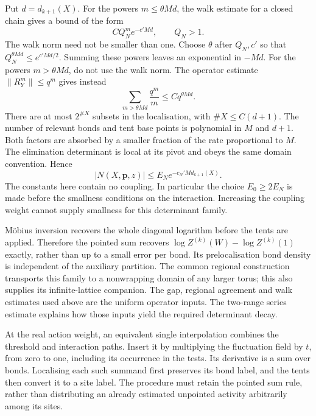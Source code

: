 \documentclass[11pt,letterpaper,reqno]{amsart}
\theoremstyle{definition}
\theoremstyle{remark}
\begin{document}
Put $d=d_{k+1}(X)$. For the powers
$m\le\theta Md$, the walk estimate for a closed chain gives
a bound of the form
\[
 C Q_N^m e^{-c'Md},\qquad Q_N>1.
\]
The walk norm need not be smaller than one. Choose $\theta$
after $Q_N,c'$ so that
$Q_N^{\theta Md}\le e^{c'Md/2}$. Summing these powers leaves
an exponential in $-Md$. For the powers $m>\theta Md$, do
not use the walk norm. The operator estimate $\|R_Y^m\|\le q^m$
gives instead
\[
 \sum_{m>\theta Md}\frac{q^m}{m}
          \le Cq^{\theta Md}.
\]
There are at most $2^{\#X}$ subsets in the localisation, with
$\#X\le C(d+1)$. The number of relevant bonds and tent
base points is polynomial in $M$ and $d+1$. Both factors
are absorbed by a smaller fraction of the rate proportional
to $M$. The elimination determinant is local at its pivot
and obeys the same domain convention. Hence
\begin{equation}\label{eq:deep-normalizer-bound}
 |N(X,\mathbf p,z)|\le E_Ne^{-c_N'Md_{k+1}(X)}.
\end{equation}
The constants here contain no coupling. In particular the
choice $E_0\ge2E_N$ is made before the smallness conditions
on the interaction. Increasing the coupling weight cannot
supply smallness for this determinant family.

M\"obius inversion recovers the whole diagonal logarithm before
the tents are applied. Therefore the pointed sum recovers
$\log Z^{(k)}(W)-\log Z^{(k)}(1)$ exactly, rather than up to
a small error per bond. Its prelocalisation bond density is
independent of the auxiliary partition. The common regional
construction transports this family to a nonwrapping domain
of any larger torus; this also supplies its infinite-lattice
companion. The gap, regional agreement and walk estimates
used above are the uniform operator inputs. The two-range
series estimate explains how those inputs yield the required
determinant decay.

At the real action weight, an equivalent single interpolation
combines the threshold and interaction paths. Insert it by multiplying
the fluctuation field by $t$, from zero to one, including
its occurrence in the tests. Its derivative is a sum over
bonds. Localising each such summand first preserves its
bond label, and the tents then convert it to a site label.
The procedure must retain the pointed sum rule, rather
than distributing an already estimated unpointed activity
arbitrarily among its sites.
\end{document}
